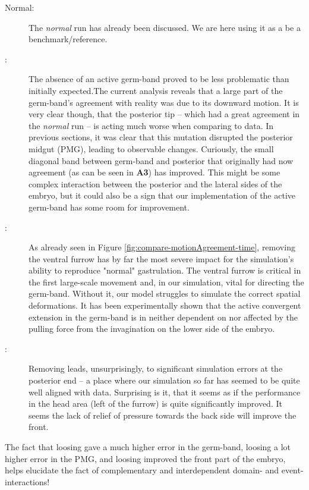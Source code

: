\begin{description}
    \item[Normal:] The \textit{normal} run has already been discussed. We are here using it as a be a benchmark/reference. 
    \item[:] The absence of an active germ-band proved to be less problematic than initially expected.The current analysis reveals that a large part of the germ-band's agreement with reality was due to its downward motion. It is very clear though, that the posterior tip --  which had a great agreement in the \textit{normal} run -- is acting much worse when comparing to data. In previous sections, it was clear that this mutation disrupted the posterior midgut (PMG), leading to observable changes. Curiously, the small diagonal band between germ-band and posterior that originally had now agreement (as can be seen in \textbf{A3}) has improved. This might be some complex interaction between the posterior and the lateral sides of the embryo, but it could also be a sign that our implementation of the active germ-band has some room for improvement.\\
    \item[:] As already seen in Figure \ref{fig:compare-motionAgreement-time}, removing the ventral furrow has by far the most severe impact for the simulation’s ability to reproduce "normal" gastrulation. The ventral furrow is critical in the first large-scale movement and, in our simulation, vital for directing the germ-band. Without it, our model struggles to simulate the correct spatial deformations. It has been experimentally shown that the active convergent extension in the germ-band is in neither dependent on nor affected by the pulling force from the invagination on the lower side of the embryo.\cite{lye2024polarised} 
    \item[:] Removing  leads, unsurprisingly, to significant simulation errors at the posterior end -- a place where our simulation so far has seemed to be quite well aligned with data. Surprising is it, that it seems as if the performance in the head area (left of the  furrow) is quite significantly improved.
    It seems the lack of relief of pressure towards the back side will improve the front.  
\end{description}

The fact that loosing  gave a much higher error in the germ-band, loosing  a lot higher error in the PMG, and loosing  improved the front part of the embryo, helps elucidate the fact of complementary and interdependent domain- and event- interactions!




